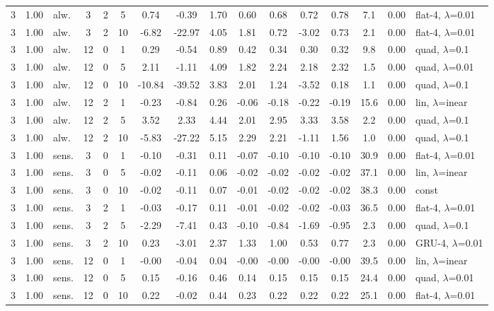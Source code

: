 \begin{scriptsize}
\begin{longtable}{cclcc c ccc ccc c cc l}
3 & 1.00 & alw. & 3 & 2 & 5 & 0.74 & -0.39 & 1.70 & 0.60 & 0.68 & 0.72 & 0.78 & 7.1 & 0.00 & flat-4, $\lambda$=0.01 \\
3 & 1.00 & alw. & 3 & 2 & 10 & -6.82 & -22.97 & 4.05 & 1.81 & 0.72 & -3.02 & 0.73 & 2.1 & 0.00 & flat-4, $\lambda$=0.01 \\
3 & 1.00 & alw. & 12 & 0 & 1 & 0.29 & -0.54 & 0.89 & 0.42 & 0.34 & 0.30 & 0.32 & 9.8 & 0.00 & quad, $\lambda$=0.1 \\
3 & 1.00 & alw. & 12 & 0 & 5 & 2.11 & -1.11 & 4.09 & 1.82 & 2.24 & 2.18 & 2.32 & 1.5 & 0.00 & quad, $\lambda$=0.01 \\
3 & 1.00 & alw. & 12 & 0 & 10 & -10.84 & -39.52 & 3.83 & 2.01 & 1.24 & -3.52 & 0.18 & 1.1 & 0.00 & quad, $\lambda$=0.1 \\
3 & 1.00 & alw. & 12 & 2 & 1 & -0.23 & -0.84 & 0.26 & -0.06 & -0.18 & -0.22 & -0.19 & 15.6 & 0.00 & lin, $\lambda$=inear \\
3 & 1.00 & alw. & 12 & 2 & 5 & 3.52 & 2.33 & 4.44 & 2.01 & 2.95 & 3.33 & 3.58 & 2.2 & 0.00 & quad, $\lambda$=0.1 \\
3 & 1.00 & alw. & 12 & 2 & 10 & -5.83 & -27.22 & 5.15 & 2.29 & 2.21 & -1.11 & 1.56 & 1.0 & 0.00 & quad, $\lambda$=0.1 \\
3 & 1.00 & sens. & 3 & 0 & 1 & -0.10 & -0.31 & 0.11 & -0.07 & -0.10 & -0.10 & -0.10 & 30.9 & 0.00 & flat-4, $\lambda$=0.01 \\
3 & 1.00 & sens. & 3 & 0 & 5 & -0.02 & -0.11 & 0.06 & -0.02 & -0.02 & -0.02 & -0.02 & 37.1 & 0.00 & lin, $\lambda$=inear \\
3 & 1.00 & sens. & 3 & 0 & 10 & -0.02 & -0.11 & 0.07 & -0.01 & -0.02 & -0.02 & -0.02 & 38.3 & 0.00 & const \\
3 & 1.00 & sens. & 3 & 2 & 1 & -0.03 & -0.17 & 0.11 & -0.01 & -0.02 & -0.02 & -0.03 & 36.5 & 0.00 & flat-4, $\lambda$=0.01 \\
3 & 1.00 & sens. & 3 & 2 & 5 & -2.29 & -7.41 & 0.43 & -0.10 & -0.84 & -1.69 & -0.95 & 2.3 & 0.00 & quad, $\lambda$=0.1 \\
3 & 1.00 & sens. & 3 & 2 & 10 & 0.23 & -3.01 & 2.37 & 1.33 & 1.00 & 0.53 & 0.77 & 2.3 & 0.00 & GRU-4, $\lambda$=0.01 \\
3 & 1.00 & sens. & 12 & 0 & 1 & -0.00 & -0.04 & 0.04 & -0.00 & -0.00 & -0.00 & -0.00 & 39.5 & 0.00 & lin, $\lambda$=inear \\
3 & 1.00 & sens. & 12 & 0 & 5 & 0.15 & -0.16 & 0.46 & 0.14 & 0.15 & 0.15 & 0.15 & 24.4 & 0.00 & quad, $\lambda$=0.01 \\
3 & 1.00 & sens. & 12 & 0 & 10 & 0.22 & -0.02 & 0.44 & 0.23 & 0.22 & 0.22 & 0.22 & 25.1 & 0.00 & flat-4, $\lambda$=0.01 \\

\end{longtable}
\end{scriptsize}
